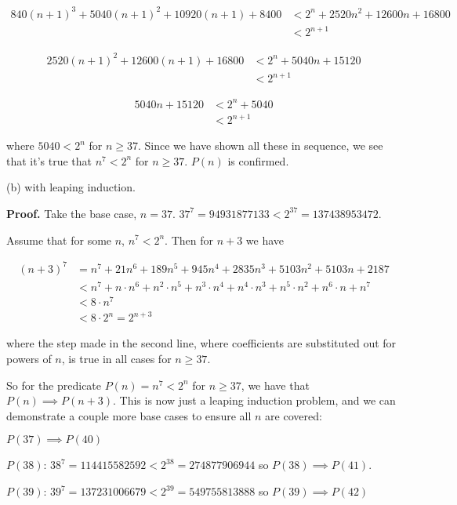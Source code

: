 \documentclass{article}
\begin{document}
\begin{align*}
  840 (n+1)^3 + 5040 (n+1)^2 + 10920 (n+1) + 8400 &< 2^n + 2520 n^2 + 12600 n + 16800\\
  &< 2^{n+1}
\end{align*}

\begin{align*}
  2520 (n+1)^2 + 12600 (n+1) + 16800 &< 2^n + 5040 n + 15120\\
  &< 2^{n+1}
\end{align*}

\begin{align*}
  5040 n + 15120 &< 2^n + 5040 \\
  &< 2^{n+1}
\end{align*}

where $5040 < 2^n$ for $n\geq37$. Since we have shown all these in sequence, we see that it's true that $n^7 < 2^n$ for $n\geq 37$. $P(n)$ is confirmed.
    
    


\noindent (b) with leaping induction.

\textbf{Proof.} Take the base case, $n = 37$. $37^7 = 94931877133 < 2^37 = 137438953472$.

Assume that for some $n$, $n^7 < 2^n$. Then for $n+3$ we have

\begin{align*}
  (n+3)^7 &= n^7 + 21n^6 + 189n^5 + 945n^4 + 2835n^3 + 5103n^2 + 5103n + 2187 \\
  &< n^7 + n\cdot n^6 + n^2\cdot n^5 + n^3\cdot n^4 + n^4\cdot n^3 + n^5\cdot n^2 + n^6\cdot n + n^7 \\
  &< 8\cdot n^7 \\
  &< 8\cdot 2^n = 2^{n+3}
\end{align*}

where the step made in the second line, where coefficients are substituted out for powers of $n$, is true in all cases for $n \geq 37$. 

So for the predicate $P(n) = n^7 < 2^n$ for $n \geq 37$, we have that $P(n) \implies P(n+3)$. This is now just a leaping induction problem, and we can demonstrate a couple more base cases to ensure all $n$ are covered:

\smallskip

$P(37) \implies P(40)$

$P(38)$: $38^7 = 114415582592 < 2^{38} = 274877906944$ so $P(38) \implies P(41)$.

$P(39)$: $39^7 = 137231006679 < 2^{39} = 549755813888$ so $P(39) \implies P(42)$
\end{document}
